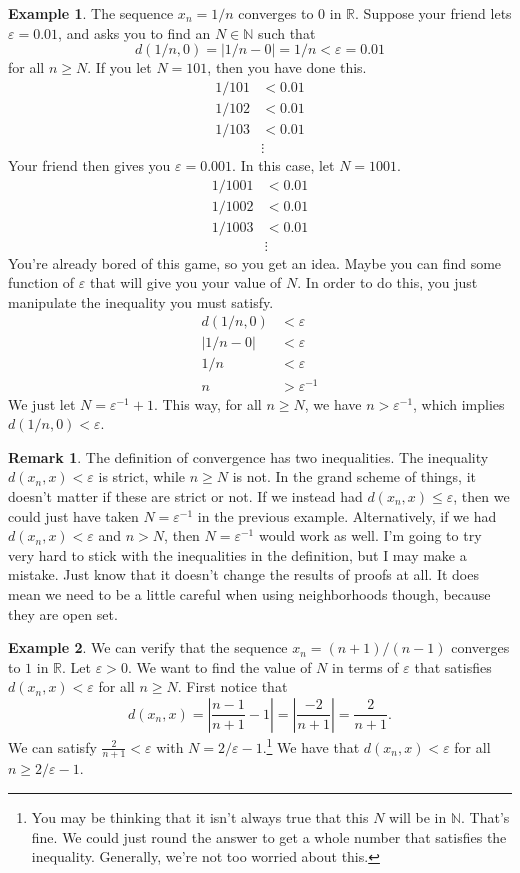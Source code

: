 \documentclass{article}
\newcommand{\N}{\mathbb{N}}
\newcommand{\R}{\mathbb{R}}
\theoremstyle{definition}
\newtheorem{example}{Example}[section]
\newtheorem{remark}{Remark}[section]
\begin{document}
\begin{example}
	The sequence $ x_n=1/n $ converges to $ 0 $ in $ \R $. Suppose your friend lets $ \varepsilon=0.01 $, and asks you to find an $ N\in\N $ such that $$ d(1/n,0)=|1/n-0|=1/n<\varepsilon=0.01 $$ for all $ n\ge N $. If you let $ N=101 $, then you have done this. \begin{align*}
		1/101&<0.01\\1/102&<0.01\\1/103&<0.01\\&\vdots
	\end{align*} 
	Your friend then gives you $ \varepsilon=0.001 $. In this case, let $ N=1001 $.
	\begin{align*}
	1/1001&<0.01\\1/1002&<0.01\\1/1003&<0.01\\&\vdots
	\end{align*} 
	You're already bored of this game, so you get an idea. Maybe you can find some function of $ \varepsilon $ that will give you your value of $ N $. In order to do this, you just manipulate the inequality you must satisfy.
	\begin{align*}
		d(1/n,0)&<\varepsilon\\|1/n-0|&<\varepsilon\\1/n&<\varepsilon\\n&>\varepsilon^{-1}		
	\end{align*}
	We just let $ N=\varepsilon^{-1}+1 $. This way, for all $ n\ge N $, we have $ n>\varepsilon^{-1} $, which implies $ d(1/n,0)<\varepsilon $. 
\end{example}
\begin{remark}
	The definition of convergence has two inequalities. The inequality $ d(x_n,x)<\varepsilon $ is strict, while $ n\ge N $ is not. In the grand scheme of things, it doesn't matter if these are strict or not. If we instead had $ d(x_n,x)\le\varepsilon $, then we could just have taken $ N=\varepsilon^{-1} $ in the previous example. Alternatively, if we had $ d(x_n,x)<\varepsilon $ and $ n>N $, then $ N=\varepsilon^{-1} $ would work as well. I'm going to try very hard to stick with the inequalities in the definition, but I may make a mistake. Just know that it doesn't change the results of proofs at all. It does mean we need to be a little careful when using neighborhoods though, because they are open set.   
\end{remark}
\begin{example}
	We can verify that the sequence $ x_n=(n+1)/(n-1) $ converges to $ 1 $ in $ \R $. Let $ \varepsilon>0 $. We want to find the value of $ N $ in terms of $ \varepsilon $ that satisfies $ d(x_n,x)<\varepsilon $ for all $ n\ge N $. First notice that $$d(x_n,x)=\left\lvert\frac{n-1}{n+1}-1\right\rvert=\left\lvert\frac{-2}{n+1}\right\rvert=\frac{2}{n+1} .$$
	We can satisfy $ \frac{2}{n+1}<\varepsilon $ with $ N=2/\varepsilon-1 $.\footnote{You may be thinking that it isn't always true that this $ N $ will be in $ \N $. That's fine. We could just round the answer to get a whole number that satisfies the inequality. Generally, we're not too worried about this.} We have that $ d(x_n,x)<\varepsilon $ for all $ n\ge 2/\varepsilon-1 $. 
\end{example}
\end{document}
